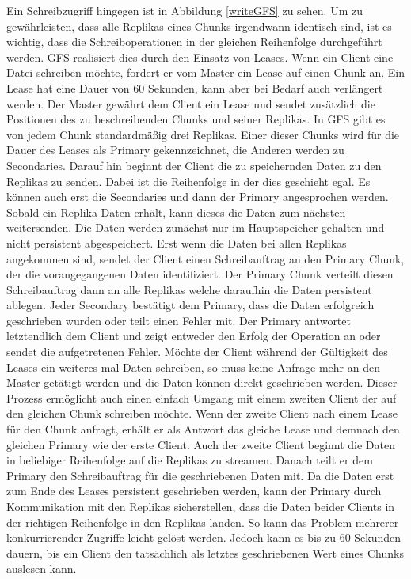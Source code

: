 \documentclass[12pt,oneside,a4paper,parskip]{scrbook}
\begin{document}
Ein Schreibzugriff hingegen ist in Abbildung \ref{writeGFS} zu sehen. Um zu gewährleisten, dass alle Replikas eines Chunks irgendwann identisch sind, ist es wichtig, dass die Schreiboperationen in der gleichen Reihenfolge durchgeführt werden. GFS realisiert dies durch den Einsatz von Leases. Wenn ein Client eine Datei schreiben möchte, fordert er vom Master ein Lease auf einen Chunk an. Ein Lease hat eine Dauer von 60 Sekunden, kann aber bei Bedarf auch verlängert werden. Der Master gewährt dem Client ein Lease und sendet zusätzlich die Positionen des zu beschreibenden Chunks und seiner Replikas. In GFS gibt es von jedem Chunk standardmäßig drei Replikas. Einer dieser Chunks wird für die Dauer des Leases als Primary gekennzeichnet, die Anderen werden zu Secondaries. Darauf hin beginnt der Client die zu speichernden Daten zu den Replikas zu senden. Dabei ist die Reihenfolge in der dies geschieht egal. Es können auch erst die Secondaries und dann der Primary angesprochen werden. Sobald ein Replika Daten erhält, kann dieses die Daten zum nächsten weitersenden. Die Daten werden zunächst nur im Hauptspeicher gehalten und nicht persistent abgespeichert. Erst wenn die Daten bei allen Replikas angekommen sind, sendet der Client einen Schreibauftrag an den Primary Chunk, der die vorangegangenen Daten identifiziert. Der Primary Chunk verteilt diesen Schreibauftrag dann an alle Replikas welche daraufhin die Daten persistent ablegen. Jeder Secondary bestätigt dem Primary, dass die Daten erfolgreich geschrieben wurden oder teilt einen Fehler mit. Der Primary antwortet letztendlich dem Client und zeigt entweder den Erfolg der Operation an oder sendet die aufgetretenen Fehler. Möchte der Client während der Gültigkeit des Leases ein weiteres mal Daten schreiben, so muss keine Anfrage mehr an den Master getätigt werden und die Daten können direkt geschrieben werden. Dieser Prozess ermöglicht auch einen einfach Umgang mit einem zweiten Client der auf den gleichen Chunk schreiben möchte. Wenn der zweite Client nach einem Lease für den Chunk anfragt, erhält er als Antwort das gleiche Lease und demnach den gleichen Primary wie der erste Client. Auch der zweite Client beginnt die Daten in beliebiger Reihenfolge auf die Replikas zu streamen. Danach teilt er dem Primary den Schreibauftrag für die geschriebenen Daten mit. Da die Daten erst zum Ende des Leases persistent geschrieben werden, kann der Primary durch Kommunikation mit den Replikas sicherstellen, dass die Daten beider Clients in der richtigen Reihenfolge in den Replikas landen. So kann das Problem mehrerer konkurrierender Zugriffe leicht gelöst werden. Jedoch kann es bis zu 60 Sekunden dauern, bis ein Client den tatsächlich als letztes geschriebenen Wert eines Chunks auslesen kann.
\end{document}

